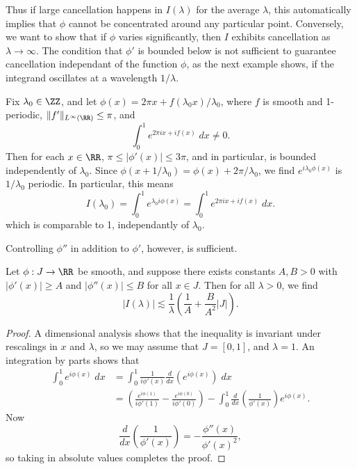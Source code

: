 Thus if large cancellation happens in $I(\lambda)$ for the average $\lambda$, this automatically implies that $\phi$ cannot be concentrated around any particular point.  Conversely, we want to show that if $\phi$ varies significantly, then $I$ exhibits cancellation as $\lambda \to \infty$. The condition that $\phi'$ is bounded below is not sufficient to guarantee cancellation independant of the function $\phi$, as the next example shows, if the integrand oscillates at a wavelength $1/\lambda$.

\begin{example}
  Fix $\lambda_0 \in \ZZ$, and let $\phi(x) = 2 \pi x + f(\lambda_0 x) / \lambda_0$, where $f$ is smooth and 1-periodic, $\| f' \|_{L^\infty(\RR)} \leq \pi$, and
  \[ \int_0^1 e^{2 \pi i x + i f(x)}\; dx \neq 0. \]
  Then for each $x \in \RR$, $\pi \leq |\phi'(x)| \leq 3\pi$, and in particular, is bounded independently of $\lambda_0$. Since $\phi(x + 1/\lambda_0) = \phi(x) + 2 \pi / \lambda_0$, we find $e^{i \lambda_0 \phi(x)}$ is $1/\lambda_0$ periodic. In particular, this means
  \[ I(\lambda_0) = \int_0^1 e^{\lambda_0 i \phi(x)} = \int_0^1 e^{2 \pi i x + i f(x)}\; dx. \]
  which is comparable to 1, independantly of $\lambda_0$.
\end{example}

Controlling $\phi''$ in addition to $\phi'$, however, is sufficient.

\begin{theorem}
  Let $\phi: J \to \RR$ be smooth, and suppose there exists constants $A,B > 0$ with $|\phi'(x)| \geq A$ and $|\phi''(x)| \leq B$ for all $x \in J$. Then for all $\lambda > 0$, we find
  \[ |I(\lambda)| \lesssim \frac{1}{\lambda} \left( \frac{1}{A} + \frac{B}{A^2} |J| \right). \]
\end{theorem}
\begin{proof}
  A dimensional analysis shows that the inequality is invariant under rescalings in $x$ and $\lambda$, so we may assume that $J = [0,1]$, and $\lambda = 1$. An integration by parts shows that
  \begin{align*}
    \int_0^1 e^{i \phi(x)}\; dx &= \int_0^1 \frac{1}{i \phi'(x)} \frac{d}{dx} \left( e^{i \phi(x)} \right)\; dx\\
    &= \left( \frac{e^{i \phi(1)}}{i \phi'(1)} - \frac{e^{i \phi(0)}}{i \phi'(0)} \right) - \int_0^1 \frac{d}{dx} \left( \frac{1}{\phi'(x)} \right) e^{i \phi(x)}.
  \end{align*}
  Now
  \[ \frac{d}{dx} \left( \frac{1}{\phi'(x)} \right) = - \frac{\phi''(x)}{\phi'(x)^2}, \]
  so taking in absolute values completes the proof.
\end{proof}

